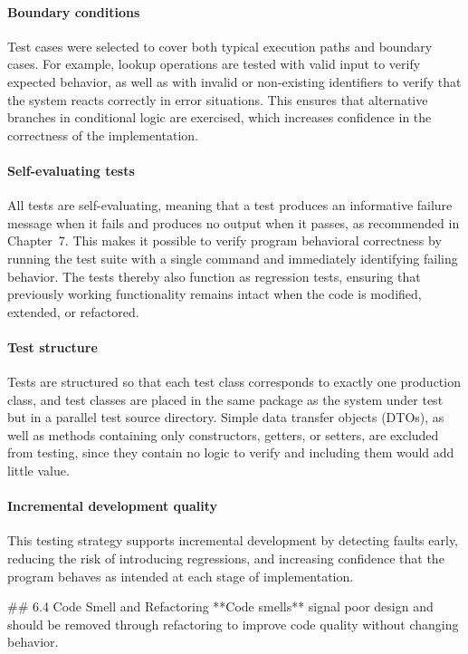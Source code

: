 \documentclass[a4paper]{scrartcl}
\begin{document}
\paragraph{Boundary conditions} Test cases were selected to cover both typical execution paths and boundary cases. For example, lookup operations are tested with valid input to verify expected behavior, as well as with invalid or non-existing identifiers to verify that the system reacts correctly in error situations. This ensures that alternative branches in conditional logic are exercised, which increases confidence in the correctness of the implementation.

\paragraph{Self-evaluating tests} All tests are self-evaluating, meaning that a test produces an informative failure message when it fails and produces no output when it passes, as recommended in Chapter~7. This makes it possible to verify program behavioral correctness by running the test suite with a single command and immediately identifying failing behavior. The tests thereby also function as regression tests, ensuring that previously working functionality remains intact when the code is modified, extended, or refactored.

\paragraph{Test structure} Tests are structured so that each test class corresponds to exactly one production class, and test classes are placed in the same package as the system under test but in a parallel test source directory. Simple data transfer objects (DTOs), as well as methods containing only constructors, getters, or setters, are excluded from testing, since they contain no logic to verify and including them would add little value.

\paragraph{Incremental development quality} This testing strategy supports incremental development by detecting faults early, reducing the risk of introducing regressions, and increasing confidence that the program behaves as intended at each stage of implementation.



\iffalse
## 6.4 Code Smell and Refactoring
**Code smells** signal poor design and should be removed through refactoring to improve code quality without changing behavior.
\end{document}
